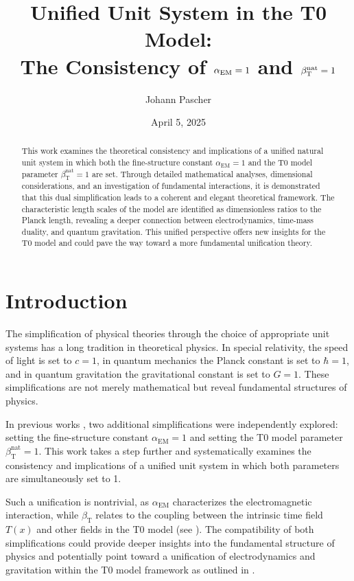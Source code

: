 \documentclass[12pt,a4paper]{article}
\title{Unified Unit System in the T0 Model: \\The Consistency of \(\alphaEM = 1\) and \(\betaT^{\text{nat}} = 1\)}
\author{Johann Pascher}
\date{April 5, 2025}
\newcommand{\Tfield}{T(x)}
\newcommand{\alphaEM}{\alpha_{\text{EM}}}
\newcommand{\betaT}{\beta_{\text{T}}}
\begin{document}
	
	\maketitle
	
	\begin{abstract}
		This work examines the theoretical consistency and implications of a unified natural unit system in which both the fine-structure constant \(\alphaEM = 1\) and the T0 model parameter \(\betaT^{\text{nat}} = 1\) are set. Through detailed mathematical analyses, dimensional considerations, and an investigation of fundamental interactions, it is demonstrated that this dual simplification leads to a coherent and elegant theoretical framework. The characteristic length scales of the model are identified as dimensionless ratios to the Planck length, revealing a deeper connection between electrodynamics, time-mass duality, and quantum gravitation. This unified perspective offers new insights for the T0 model and could pave the way toward a more fundamental unification theory.
	\end{abstract}
	
	\tableofcontents
	\newpage
	
	\section{Introduction}
	\label{sec:introduction}
	
	The simplification of physical theories through the choice of appropriate unit systems has a long tradition in theoretical physics. In special relativity, the speed of light is set to \(c = 1\), in quantum mechanics the Planck constant is set to \(\hbar = 1\), and in quantum gravitation the gravitational constant is set to \(G = 1\). These simplifications are not merely mathematical but reveal fundamental structures of physics.
	
	In previous works \cite{pascher_alpha_2025, pascher_alphabeta_2025}, two additional simplifications were independently explored: setting the fine-structure constant \(\alphaEM = 1\) and setting the T0 model parameter \(\betaT^{\text{nat}} = 1\). This work takes a step further and systematically examines the consistency and implications of a unified unit system in which both parameters are simultaneously set to 1.
	
	Such a unification is nontrivial, as \(\alphaEM\) characterizes the electromagnetic interaction, while \(\betaT\) relates to the coupling between the intrinsic time field \(\Tfield\) and other fields in the T0 model (see \cite{pascher_zeit_2025, pascher_higgs_2025}). The compatibility of both simplifications could provide deeper insights into the fundamental structure of physics and potentially point toward a unification of electrodynamics and gravitation within the T0 model framework as outlined in \cite{pascher_emergente_gravitation_2025}.
	
\end{document}
